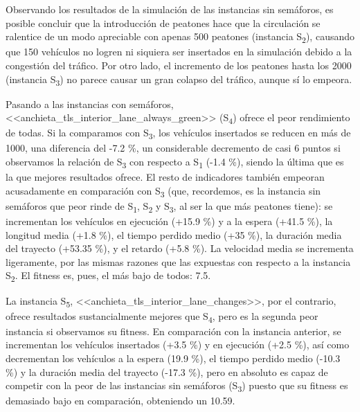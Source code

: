 Observando los resultados de la simulación de las instancias sin semáforos, es posible concluir que la introducción de peatones hace que la circulación se ralentice de un modo apreciable con apenas 500 peatones (instancia S\textsubscript{2}), causando que 150 vehículos no logren ni siquiera ser insertados en la simulación debido a la congestión del tráfico. Por otro lado, el incremento de los peatones hasta los 2000 (instancia S\textsubscript{3}) no parece causar un gran colapso del tráfico, aunque sí lo empeora.

Pasando a las instancias con semáforos, <<anchieta\_tls\_interior\_lane\_always\_green>> (S\textsubscript{4}) ofrece el peor rendimiento de todas. Si la comparamos con S\textsubscript{3}, los vehículos insertados se reducen en más de 1000, una diferencia del -7.2 \%, un considerable decremento de casi 6 puntos si observamos la relación de S\textsubscript{3} con respecto a S\textsubscript{1} (-1.4 \%), siendo la última que es la que mejores resultados ofrece. El resto de indicadores también empeoran acusadamente en comparación con S\textsubscript{3} (que, recordemos, es la instancia sin semáforos que peor rinde de S\textsubscript{1}, S\textsubscript{2} y S\textsubscript{3}, al ser la que más peatones tiene): se incrementan los vehículos en ejecución (+15.9 \%) y a la espera (+41.5 \%), la longitud media (+1.8 \%), el tiempo perdido medio (+35 \%), la duración media del trayecto (+53.35 \%), y el retardo (+5.8 \%). La velocidad media se incrementa ligeramente, por las mismas razones que las expuestas con respecto a la instancia S\textsubscript{2}. El fitness es, pues, el más bajo de todos: 7.5.

La instancia S\textsubscript{5}, <<anchieta\_tls\_interior\_lane\_changes>>, por el contrario, ofrece resultados sustancialmente mejores que S\textsubscript{4}, pero es la segunda peor instancia si observamos su fitness. En comparación con la instancia anterior, se incrementan los vehículos insertados (+3.5 \%) y en ejecución (+2.5 \%), así como decrementan los vehículos a la espera (19.9 \%), el tiempo perdido medio (-10.3 \%) y la duración media del trayecto (-17.3 \%), pero en absoluto es capaz de competir con la peor de las instancias sin semáforos (S\textsubscript{3}) puesto que su fitness es demasiado bajo en comparación, obteniendo un 10.59.

